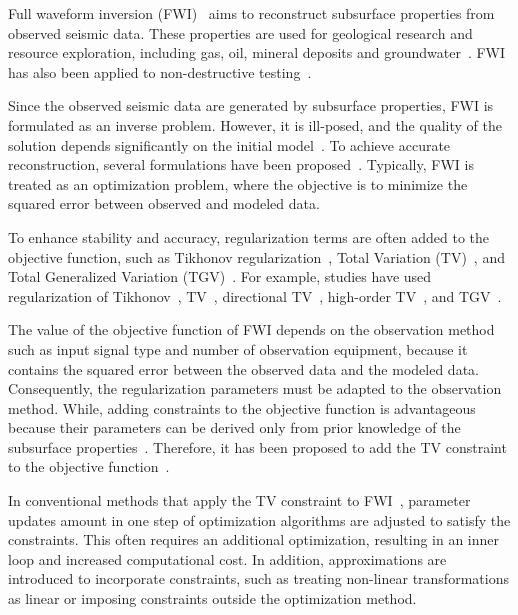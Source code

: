 Full waveform inversion (FWI)~\cite{FWI0,FWI1} aims to reconstruct subsurface properties from observed seismic data.
These properties are used for geological research and resource exploration, including gas, oil, mineral deposits and groundwater~\cite{FWI1,FWIApplicationGroundwater0,FWIApplicationGroundwater1}.
FWI has also been applied to non-destructive testing~\cite{FWIApplicationNonDestructiveTesting0,FWIApplicationNonDestructiveTesting1}.

Since the observed seismic data are generated by subsurface properties, FWI is formulated as an inverse problem.
However, it is ill-posed, and the quality of the solution depends significantly on the initial model~\cite{FWI1}.
To achieve accurate reconstruction, several formulations have been proposed~\cite{FWI0,CustomFWI0,CustomFWI1,CustomFWI2,CustomFWI3,CustomFWI4,CustomFWI5}.
Typically, FWI is treated as an optimization problem, where the objective is to minimize the squared error between observed and modeled data.

To enhance stability and accuracy, regularization terms are often added to the objective function, such as Tikhonov regularization~\cite{tikhonov}, Total Variation (TV)~\cite{TV}, and Total Generalized Variation (TGV)~\cite{TGV}.
For example, studies have used regularization of Tikhonov~\cite{FWI-with-tikhonov-regularization}, TV~\cite{FWI-with-TV-regularization}, directional TV~\cite{FWI-with-directional-TV-regularization}, high-order TV~\cite{FWI-with-high-order-TV-regularization}, and TGV~\cite{FWI-with-TGV-regularization}.

The value of the objective function of FWI depends on the observation method such as input signal type and number of observation equipment, because it contains the squared error between the observed data and the modeled data.
Consequently, the regularization parameters must be adapted to the observation method.
While, adding constraints to the objective function is advantageous because their parameters can be derived only from prior knowledge of the subsurface properties~\cite{constraints-vs-penalties-in-FWI}.
Therefore, it has been proposed to add the TV constraint to the objective function~\cite{FWI-with-TV-constraint,FWI-with-TV-constraint2,FWI-with-TV-constraint3}.

In conventional methods that apply the TV constraint to FWI~\cite{FWI-with-TV-constraint,FWI-with-TV-constraint2}, parameter updates amount in one step of optimization algorithms are adjusted to satisfy the constraints.
This often requires an additional optimization, resulting in an inner loop and increased computational cost.
In addition, approximations are introduced to incorporate constraints, such as treating non-linear transformations as linear or imposing constraints outside the optimization method.

